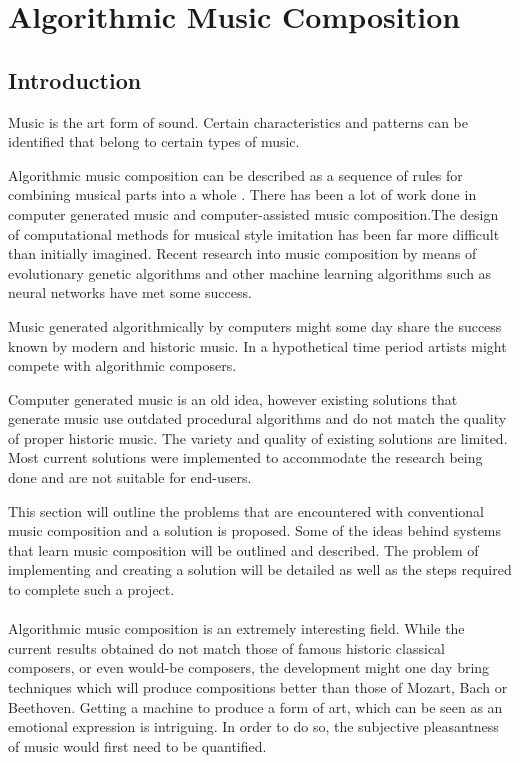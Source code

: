 \chapter{Algorithmic Music Composition}
\section{Introduction}
Music is the art form of sound. Certain characteristics and patterns can be identified that belong to certain types of music.

Algorithmic music composition can be described as a sequence of rules for combining musical parts into a whole \cite{Tanaka1993}.
There has been a lot of work done in computer generated music and computer-assisted music composition.The design of computational methods for musical style imitation has been far more difficult than initially imagined.
Recent research into music composition by means of evolutionary genetic algorithms and other machine learning algorithms such as neural networks have met some success.

Music generated algorithmically by computers might some day share the success known by modern and historic music. In a hypothetical time period artists might compete with algorithmic composers.

Computer generated music is an old idea, however existing solutions that generate music use outdated procedural algorithms and do not match the quality of proper historic music. The variety and quality of existing solutions are limited. Most current solutions were implemented to accommodate the research being done and are not suitable for end-users.

This section will outline the problems that are encountered with conventional music composition and a solution is proposed. Some of the ideas behind systems that learn music composition will be outlined and described. The problem of implementing and creating a solution will be detailed as well as the steps required to complete such a project.
\\
\\
Algorithmic music composition is an extremely interesting field. While the current results obtained do not match those of famous historic classical composers, or even would-be composers, the development might one day bring techniques which will produce compositions better than those of Mozart, Bach or Beethoven. Getting a machine to produce a form of art, which can be seen as an emotional expression is intriguing. In order to do so, the subjective pleasantness of music would first need to be quantified. 

